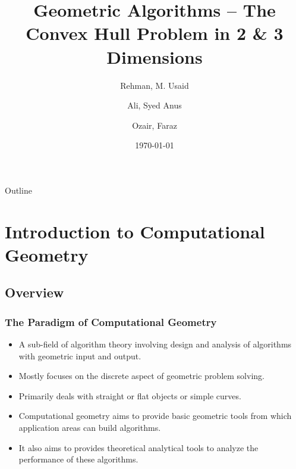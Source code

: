 \documentclass{beamer}
\title[Geometric Algorithms: Convex Hull]{Geometric Algorithms -- The Convex Hull Problem in 2 \& 3 Dimensions}
\author[Rehman, Ali, Ozair] %
{Rehman, M. Usaid \and Ali, Syed Anus \and Ozair, Faraz}
\institute{Habib University} %
\date{\today} %
\begin{document}
\begin{frame}
  \titlepage
\end{frame}

\begin{frame}{Outline}
  \tableofcontents%
\end{frame}


\section{Introduction to Computational Geometry}

\subsection{Overview}
\begin{frame}
  \frametitle{The Paradigm of Computational Geometry}
  \begin{itemize}
      \item A sub-field of algorithm theory involving design and analysis of algorithms with geometric input and output. 
      \vspace{0.5 em}
      \item Mostly focuses on the discrete aspect of geometric problem solving.
      \vspace{0.5 em}
      \item Primarily deals with straight or flat objects or simple curves.
      \vspace{0.5 em}
      \item Computational geometry aims to provide basic geometric tools from which application areas can build algorithms. 
      \vspace{0.5 em}
      \item It also aims to provides theoretical analytical tools to analyze the 
      performance of these algorithms.
  \end{itemize}
\end{frame}
\end{document}
